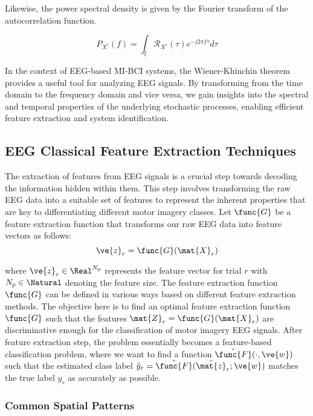Likewise, the power spectral density is given by the Fourier transform of the autocorrelation function.

\begin{equation}
    P_{X^c}(f) = \int_{\mathbb{f}} \mathcal{R}_{X^c}(\tau) e^{-j 2\pi f \tau} d\tau
\end{equation}

In the context of EEG-based MI-BCI systems, the Wiener-Khinchin theorem provides a useful tool for analyzing EEG signals. By transforming from the time domain to the frequency domain and vice versa, we gain insights into the spectral and temporal properties of the underlying stochastic processes, enabling efficient feature extraction and system identification.


\subsection{EEG Classical Feature Extraction Techniques}

The extraction of features from EEG signals is a crucial step towards decoding the information hidden within them. This step involves transforming the raw EEG data into a suitable set of features to represent the inherent properties that are key to differentiating different motor imagery classes. Let $\func{G}$ be a feature extraction function that transforms our raw EEG data into feature vectors as follows:
\begin{equation}
\ve{z}_r = \func{G}(\mat{X}_r)    
\end{equation}

where $\ve{z}_r \in \Real^{N_p}$ represents the feature vector for trial $r$ with $N_p \in \Natural$ denoting the feature size. The feature extraction function $\func{G}$ can be defined in various ways based on different feature extraction methods. The objective here is to find an optimal feature extraction function $\func{G}$ such that the features $\mat{Z}_r = \func{G}(\mat{X}_r)$ are discriminative enough for the classification of motor imagery EEG signals. After feature extraction step, the problem essentially becomes a feature-based classification problem, where we want to find a function $\hat{\func{F}}(\cdot,\ve{w})$ such that the estimated class label $\hat{y}_r = \hat{\func{F}}(\hat{\mat{z}}_r; \ve{w})$ matches the true label $y_r$ as accurately as possible.

\subsubsection{Common Spatial Patterns}

